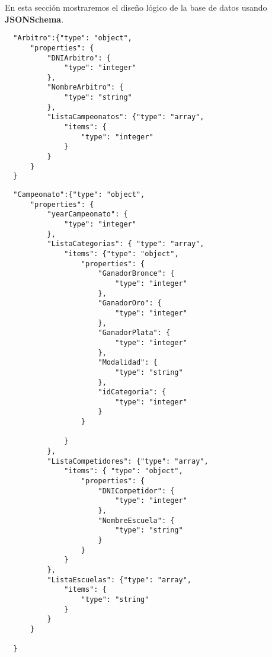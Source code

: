 En esta sección mostraremos el diseño lógico de la base de datos usando \textbf{JSONSchema}.

\begin{lstlisting}
  "Arbitro":{"type": "object",
      "properties": {
          "DNIArbitro": {
              "type": "integer"
          },
          "NombreArbitro": {
              "type": "string"
          },
          "ListaCampeonatos": {"type": "array",
              "items": {
                  "type": "integer"
              }
          }
      }
  }
\end{lstlisting}

\begin{lstlisting}
  "Campeonato":{"type": "object",
      "properties": {
          "yearCampeonato": {
              "type": "integer"
          },
          "ListaCategorias": { "type": "array",
              "items": {"type": "object",
                  "properties": {
                      "GanadorBronce": {
                          "type": "integer"
                      },
                      "GanadorOro": {
                          "type": "integer"
                      },
                      "GanadorPlata": {
                          "type": "integer"
                      },
                      "Modalidad": {
                          "type": "string"
                      },
                      "idCategoria": {
                          "type": "integer"
                      }
                  }

              }
          },
          "ListaCompetidores": {"type": "array",
              "items": { "type": "object",
                  "properties": {
                      "DNICompetidor": {
                          "type": "integer"
                      },
                      "NombreEscuela": {
                          "type": "string"
                      }
                  }
              }
          },
          "ListaEscuelas": {"type": "array",
              "items": {
                  "type": "string"
              }
          }
      }

  }
\end{lstlisting}

